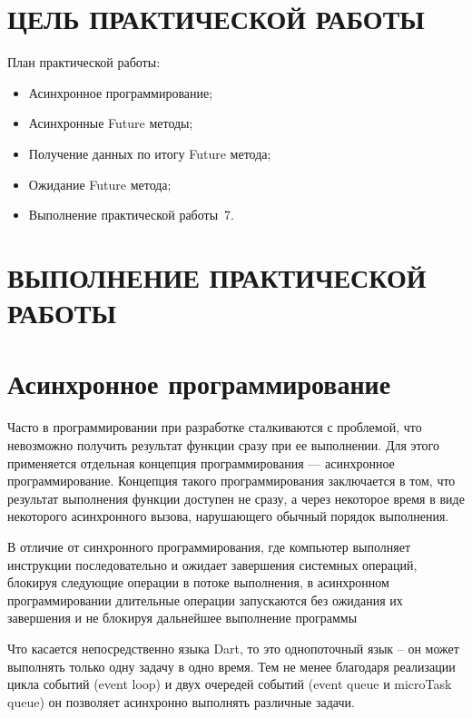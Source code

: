 \section*{ЦЕЛЬ ПРАКТИЧЕСКОЙ РАБОТЫ}

План практической работы:

\begin{itemize}
	\item Асинхронное программирование;
	\item Асинхронные Future методы;
	\item Получение данных по итогу Future метода;
	\item Ожидание Future метода;
	\item Выполнение практической работы \No\,7.
\end{itemize}

\clearpage

\section*{ВЫПОЛНЕНИЕ ПРАКТИЧЕСКОЙ РАБОТЫ}

\section{Асинхронное программирование}

Часто в программировании при разработке сталкиваются с проблемой,
что невозможно получить результат функции сразу при ее выполнении.
Для этого применяется отдельная концепция программирования
--- асинхронное программирование.
Концепция такого программирования заключается в том,
что результат выполнения функции доступен не сразу,
а через некоторое время в виде некоторого асинхронного вызова,
нарушающего обычный порядок выполнения.\par
В отличие от синхронного программирования,
где компьютер выполняет инструкции последовательно
и ожидает завершения системных операций,
блокируя следующие операции в потоке выполнения,
в асинхронном программировании длительные операции запускаются
без ожидания их завершения и не блокируя дальнейшее выполнение программы\par
Что касается непосредственно языка Dart, то это однопоточный язык – он может выполнять только одну задачу в одно время. Тем не менее благодаря реализации цикла событий (event loop) и двух очередей событий (event queue и microTask queue) он позволяет асинхронно выполнять различные задачи.

